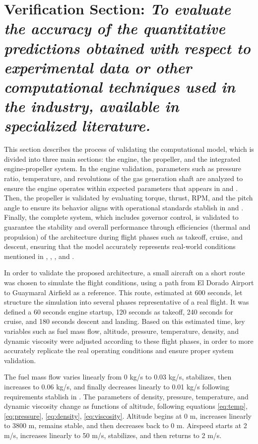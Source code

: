 \documentclass{Format}
\begin{document}
\section{Verification Section: \emph{To evaluate the accuracy of the quantitative predictions obtained with respect to experimental data or other computational techniques used in the industry, available in specialized literature.}}\label{sec:Method}

This section describes the process of validating the computational model, which is divided into three main sections: the engine, the propeller, and the integrated engine-propeller system. In the engine validation, parameters such as pressure ratio, temperature, and revolutions of the gas generation shaft are analyzed to ensure the engine operates within expected parameters that appears in \cite{Castellanos2019} and \cite{Piper1998}. Then, the propeller is validated by evaluating torque, thrust, RPM, and the pitch angle to ensure its behavior aligns with operational standards stablish in \cite{Castellanos2023Propeller} and \cite{Piper1998}. Finally, the complete system, which includes governor control, is validated to guarantee the stability and overall performance through efficiencies (thermal and propulsion)  of the architecture during flight phases such as takeoff, cruise, and descent, ensuring that the model accurately represents real-world conditions mentioned in \cite{Castellanos2023Propeller}, \cite{Piper1998}, \cite{book:96630002}, \cite{stengel2024power} and \cite{pulido2008conversión}.

In order to validate the proposed architecture, a small aircraft on a short route was chosen to simulate the flight conditions, using a path from El Dorado Airport to Guaymaral Airfield as a reference. This route, estimated at 600 seconds, let structure the simulation into several phases representative of a real flight. It was defined a 60 seconds engine startup, 120 seconds as takeoff, 240 seconds for cruise, and 180 seconds descent and landing. Based on this estimated time, key variables such as fuel mass flow, altitude, pressure, temperature, density, and dynamic viscosity were adjusted according to these flight phases, in order to more accurately replicate the real operating conditions and ensure proper system validation.

The fuel mass flow varies linearly from 0 kg/s to 0.03 kg/s, stabilizes, then increases to 0.06 kg/s, and finally decreases linearly to 0.01 kg/s following requirements stablish in \cite{Piper1998} . The parameters of density, pressure, temperature, and dynamic viscosity change as functions of altitude, following equations \ref{eq:temp}, \ref{eq:pressure}, \ref{eq:density}, \ref{eq:viscosity}. Altitude begins at 0 m, increases linearly to 3800 m, remains stable, and then decreases back to 0 m. Airspeed starts at 2 m/s, increases linearly to 50 m/s, stabilizes, and then returns to 2 m/s.
\end{document}
